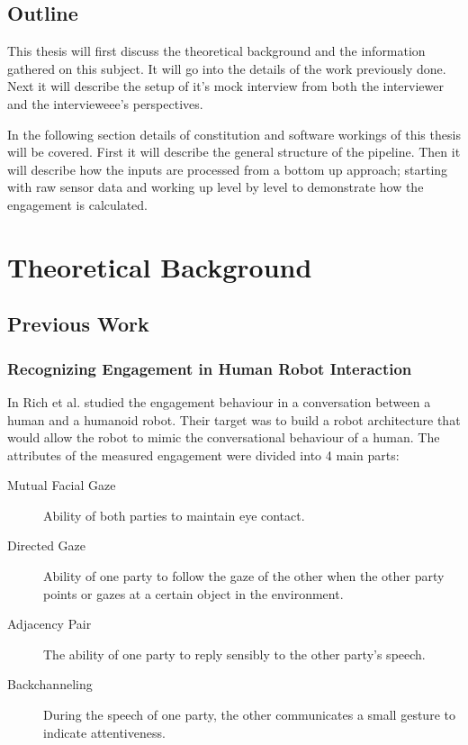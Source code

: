 \documentclass[12pt, a4paper, fleqn]{memoir}%
\begin{document}
\section{Outline}
\label{sec:Outline}
This thesis will first discuss the theoretical background and the information gathered on this subject. It will go into the details of the work previously done. Next it will describe the setup of it's mock interview from both the interviewer and the intervieweee's perspectives.

In the following section details of constitution and software workings of this thesis will be covered. First it will describe the general structure of the pipeline. Then it will describe how the inputs are processed from a bottom up approach; starting with raw sensor data and working up level by level to demonstrate how the engagement is calculated.

\chapter{Theoretical Background}
\label{chap:TheoreticalBackground}

\section{Previous Work}
\label{sec:PreviousWork}

\subsection{Recognizing Engagement in Human Robot Interaction}
In \cite{rich} Rich et al. studied the engagement behaviour in a conversation between a human and a humanoid robot. Their target was to build a robot architecture that would allow the robot to mimic the conversational behaviour of a human. The attributes of the measured engagement were divided into 4 main parts:

\begin{description}
  \item[Mutual Facial Gaze] Ability of both parties to maintain eye contact.
  \item[Directed Gaze] Ability of one party to follow the gaze of the other when the other party points or gazes at a certain object in the environment.
  \item[Adjacency Pair] The ability of one party to reply sensibly to the other party's speech.
  \item[Backchanneling] During the speech of one party, the other communicates a small gesture to indicate attentiveness.
\end{description}
\end{document}

